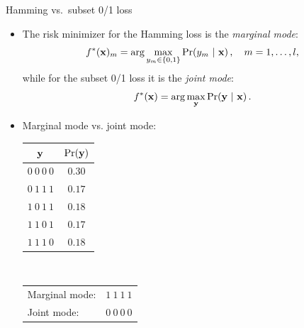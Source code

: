 \documentclass[11pt,compress,t,notes=noshow, xcolor=table]{beamer}
\begin{document}
\begin{frame}{Hamming vs.\ subset 0/1 loss}
	\begin{itemize}
		\item The risk minimizer for the Hamming loss is the  \emph{marginal mode}:
		$$
		f^*(\mathbf{x})_m = \arg \max_{y_m \in \{0,1\}} \Pr( y_m  ~|~ \mathbf{x} )\,, \quad m = 1,\ldots,l,
		$$
		while for the subset 0/1 loss it is the \emph{joint mode}:
		$$
		f^*(\mathbf{x}) = \arg \max_{\mathbf{y}} \Pr(\mathbf{y} ~|~ \mathbf{x}) \,.
		$$
		\item Marginal mode vs. joint mode:\\[6pt]
		\begin{center}
			\begin{tabular}{@{}cc@{}}
				\toprule
				$\mathbf{y}$ & $\Pr(\mathbf{y})$ \\
				\hline
				$0~0~0~0$ & $0.30$ \\
				$0~1~1~1$ & $0.17$ \\
				$1~0~1~1$ & $0.18$ \\
				$1~1~0~1$ & $0.17$ \\
				$1~1~1~0$ & $0.18$ \\
				\toprule
			\end{tabular}
			$\qquad$
			\footnotesize{
				\begin{tabular}{lr}
					Marginal mode: & $1~1~1~1$ \\
					Joint mode: & $0~0~0~0$ \\
				\end{tabular}
			}
		\end{center}
	\end{itemize}
\end{frame}
\end{document}
